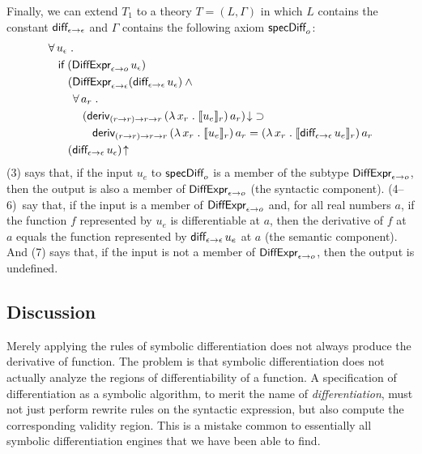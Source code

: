 \documentclass[fleqn]{llncs}
\begin{document}
Finally, we can extend $T_1$ to a theory $T = (L,\Gamma)$ in which $L$
contains the constant $\mbox{\sf diff}_{\epsilon \rightarrow \epsilon}$ and
$\Gamma$ contains the following axiom $\mbox{\sf specDiff}_o$:
\begin{align}\setcounter{equation}{0}
&
\ForallApp u_\epsilon \mdot\\
& \hspace*{2ex}
\If \; (\mname{DiffExpr}_{\epsilon \tarrow o} \, u_\epsilon)\\
& \hspace*{4ex}
(\mname{DiffExpr}_{\epsilon \tarrow \epsilon}(\mname{diff}_{\epsilon \tarrow \epsilon} \, u_\epsilon) \And {}\\
& \hspace*{5ex}
\ForallApp a_r \mdot\\
& \hspace*{7ex}
{(\mname{deriv}_{(r \tarrow r) \tarrow r \tarrow r}\,(\LambdaApp x_r \mdot \sembrack{u_e}_r)\,a_r)\IsDefApp} \Implies {}\\
& \hspace*{9ex}
\mname{deriv}_{(r \tarrow r) \tarrow r \tarrow r}\,(\LambdaApp x_r \mdot \sembrack{u_e}_r)\,a_r =
(\LambdaApp x_r \mdot \sembrack{\mname{diff}_{\epsilon \tarrow \epsilon} \, u_e}_r)\,a_r\\
& \hspace*{4ex}
(\mname{diff}_{\epsilon \tarrow \epsilon} \, u_\epsilon)\IsUndefApp
\end{align}
(3) says that, if the input $u_e$ to $\mbox{\sf specDiff}_o$ is a member
of the subtype $\mbox{\sf DiffExpr}_{\epsilon \rightarrow o}$, then the
output is also a member of $\mbox{\sf DiffExpr}_{\epsilon \rightarrow o}$
(the syntactic component). (\mbox{4--6})~say that, if the input is a
member of $\mbox{\sf DiffExpr}_{\epsilon \rightarrow o}$ and, for all real
numbers $a$, if the function $f$ represented by $u_e$ is
differentiable at $a$, then the derivative of $f$ at $a$ equals the
function represented by $\mbox{\sf diff}_{\epsilon \rightarrow \epsilon} \,
u_e$ at $a$ (the semantic component).  And (7) says that, if the input
is not a member of $\mbox{\sf DiffExpr}_{\epsilon \rightarrow o}$, then the
output is undefined.

\subsection{Discussion}

Merely applying the rules of symbolic differentiation does not
always produce the derivative of  function. The problem is that
symbolic differentiation does not actually analyze the regions of
differentiability of a function. A specification of differentiation
as a symbolic algorithm, to merit the name of \emph{differentiation},
must not just perform rewrite rules on the syntactic expression, but
also compute the corresponding validity region. This is a mistake common
to essentially all symbolic differentiation engines that we have been
able to find.
\end{document}
